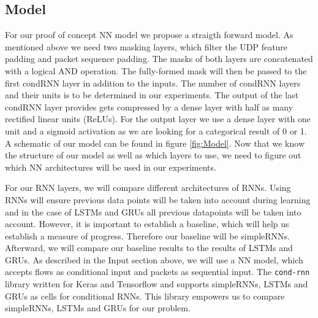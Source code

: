 \documentclass[
	ngerman,
	ruledheaders=section,%
	class=report,%
	thesis={type=bachelor},%
	accentcolor=9c,%
	custommargins=true,%
	marginpar=false,%
	parskip=half-,%
	fontsize=11pt,%
	twoside
]{tudapub}
\let\code\texttt
\begin{document}



\subsection{Model}
\label{sec:NNmodel}

For our proof of concept NN model we propose a straigth forward model.
As mentioned above we need two masking layers, which filter the UDP feature padding and packet sequence padding.
The masks of both layers are concatenated with a logical AND operation.
The fully-formed mask will then be passed to the first condRNN layer in addition to the inputs.
The number of condRNN layers and their units is to be determined in our experiments.
The output of the last condRNN layer provides gets compressed by a dense layer with half as many rectified linear units (ReLUs).
For the output layer we use a dense layer with one unit and a sigmoid activation as we are looking for a categorical result of 0 or 1.
A schematic of our model can be found in figure \ref{fig:Model}.
Now that we know the structure of our model as well as which layers to use, we need to figure out which NN architectures will be used in our experiments.

For our RNN layers, we will compare different architectures of RNNs.
Using RNNs will ensure previous data points will be taken into account during learning and in the case of LSTMs and GRUs all previous datapoints will be taken into account.
However, it is important to establish a baseline, which will help us establish a measure of progress. %
Therefore our baseline will be simpleRNNs.
Afterward, we will compare our baseline results to the results of LSTMs and GRUs.
As described in the Input section above, we will use a NN model, which accepts flows as conditional input and packets as sequential input.
The \code{cond-rnn} library \cite{remyPhilipperemyCondRnn2020} written for Keras and Tensorflow and supports simpleRNNs, LSTMs and GRUs as cells for conditional RNNs.
This library empowers us to compare simpleRNNs, LSTMs and GRUs for our problem.
\end{document}
